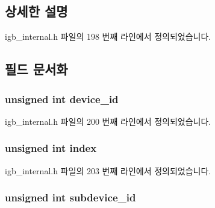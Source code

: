 \subsection{상세한 설명}


igb\+\_\+internal.\+h 파일의 198 번째 라인에서 정의되었습니다.



\subsection{필드 문서화}
\subsubsection[{\texorpdfstring{device\+\_\+id}{device_id}}]{\setlength{\rightskip}{0pt plus 5cm}unsigned int device\+\_\+id}\hypertarget{struct__igb__vendor__info__t_a2d805c7d6d45d66052531bff7b2aa1ab}{}\label{struct__igb__vendor__info__t_a2d805c7d6d45d66052531bff7b2aa1ab}


igb\+\_\+internal.\+h 파일의 200 번째 라인에서 정의되었습니다.

\subsubsection[{\texorpdfstring{index}{index}}]{\setlength{\rightskip}{0pt plus 5cm}unsigned int index}\hypertarget{struct__igb__vendor__info__t_a589d64202487f78e3cc30dd2e04c5201}{}\label{struct__igb__vendor__info__t_a589d64202487f78e3cc30dd2e04c5201}


igb\+\_\+internal.\+h 파일의 203 번째 라인에서 정의되었습니다.

\subsubsection[{\texorpdfstring{subdevice\+\_\+id}{subdevice_id}}]{\setlength{\rightskip}{0pt plus 5cm}unsigned int subdevice\+\_\+id}\hypertarget{struct__igb__vendor__info__t_a9b21d242993dc26b9ca0819c57de4159}{}\label{struct__igb__vendor__info__t_a9b21d242993dc26b9ca0819c57de4159}


